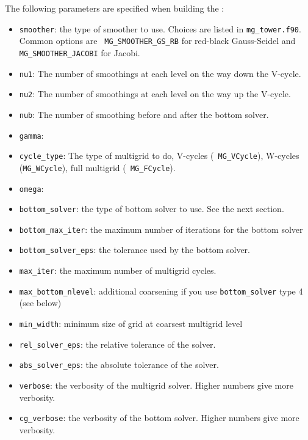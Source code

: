 The following parameters are specified when building the \mgtower:
\begin{itemize}
\item {\tt smoother}: the type of smoother to use.  Choices are listed
  in {\tt mg\_tower.f90}.  Common options are {\tt
    MG\_SMOOTHER\_GS\_RB} for red-black Gauss-Seidel and {\tt
    MG\_SMOOTHER\_JACOBI} for Jacobi.

\item {\tt nu1}: The number of smoothings at each level on the way down
  the V-cycle.

\item {\tt nu2}: The number of smoothings at each level on the way up
  the V-cycle.

\item {\tt nub}: The number of smoothing before and after the bottom solver.

\item {\tt gamma}: 

\item {\tt cycle\_type}: The type of multigrid to do, V-cycles ({\tt
  MG\_VCycle}), W-cycles ({\tt MG\_WCycle}), full multigrid ({\tt
  MG\_FCycle}).

\item {\tt omega}:  

\item {\tt bottom\_solver}: the type of bottom solver to use.  See the next
 section.

\item {\tt bottom\_max\_iter}: the maximum number of iterations for the 
  bottom solver

\item {\tt bottom\_solver\_eps}: the tolerance used by the bottom
  solver.  

\item {\tt max\_iter}: the maximum number of multigrid cycles.

\item {\tt max\_bottom\_nlevel}: additional coarsening if you use
  {\tt bottom\_solver} type 4 (see below)

\item {\tt min\_width}: minimum size of grid at coarsest multigrid level

\item {\tt rel\_solver\_eps}: the relative tolerance of the solver.

\item {\tt abs\_solver\_eps}: the absolute tolerance of the solver.

\item {\tt verbose}: the verbosity of the multigrid solver.  Higher
  numbers give more verbosity.

\item {\tt cg\_verbose}: the verbosity of the bottom solver. Higher
  numbers give more verbosity.

\end{itemize}

